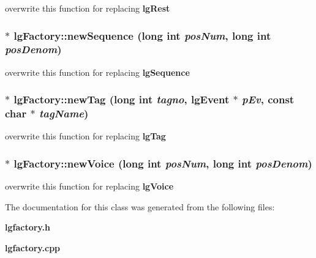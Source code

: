 overwrite this function for replacing {\bf lg\-Rest} 

\subsubsection{ $\ast$ lg\-Factory::new\-Sequence (long int {\em pos\-Num}, long int {\em pos\-Denom})\hspace{0.3cm}{\tt  [virtual]}}\label{classlgFactory_a2}


overwrite this function for replacing {\bf lg\-Sequence} 

\subsubsection{ $\ast$ lg\-Factory::new\-Tag (long int {\em tagno}, {\bf lg\-Event} $\ast$ {\em p\-Ev}, const char $\ast$ {\em tag\-Name})\hspace{0.3cm}{\tt  [virtual]}}\label{classlgFactory_a7}


overwrite this function for replacing {\bf lg\-Tag} 

\subsubsection{ $\ast$ lg\-Factory::new\-Voice (long int {\em pos\-Num}, long int {\em pos\-Denom})\hspace{0.3cm}{\tt  [virtual]}}\label{classlgFactory_a1}


overwrite this function for replacing {\bf lg\-Voice} 



The documentation for this class was generated from the following files:\begin{CompactItemize}
\item 
{\bf lgfactory.h}\item 
{\bf lgfactory.cpp}\end{CompactItemize}

